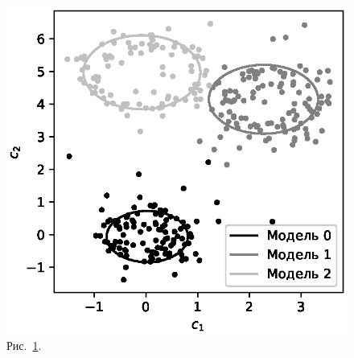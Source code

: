 \documentclass[12pt]{a&t}
\begin{document}
{\begin{figure}[h!]
	\includegraphics[height = 0.2\textheight]{902.eps}
\caption{Рис.~\ref{ce:fig3}.}
\label{ce:fig3}
\end{figure}

}
\end{document}
